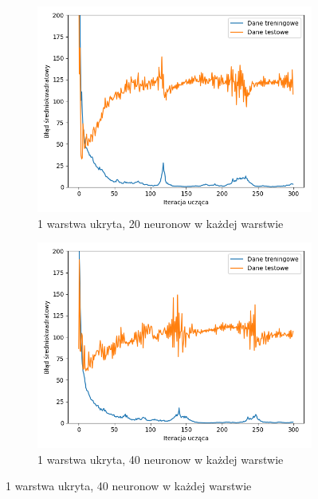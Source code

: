 \documentclass[12pt]{aghdpl}
\begin{document}
		\begin{figure}[h]
			\begin{subfigure}{.5\linewidth}
		 		\includegraphics[width =\linewidth]{wykresy/5_usrednianie_danych/1_warstwa_20_neuronow_wykres_uczenia.png}
		 		\caption{1 warstwa ukryta, 20 neuronow w każdej warstwie}
		 	\end{subfigure}
		 	\begin{subfigure}{.5\linewidth}
		 		\includegraphics[width =\linewidth]{wykresy/5_usrednianie_danych/1_warstwa_40_neuronow_wykres_uczenia.png}
		 		\caption{1 warstwa ukryta, 40 neuronow w każdej warstwie}
		 	\end{subfigure}
		 	

\end{figure}
\end{document}
